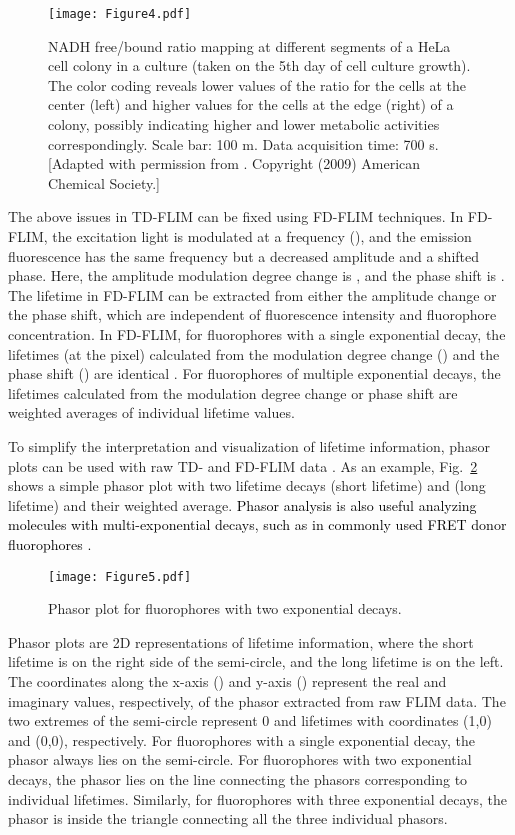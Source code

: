 \documentclass[12pt]{iopart}
\newcommand{\cc}[1]{\textcolor{black}{#1}}
\begin{document}
\begin{figure}[!t]
\centering
\texttt{[image: Figure4.pdf]}
\caption{NADH free/bound ratio mapping at different segments of a HeLa cell colony in a culture (taken on the 5th day of cell culture growth). The color coding reveals lower values of the  ratio for the cells at the center (left) and higher values for the cells at the edge (right) of a colony, possibly indicating higher and lower metabolic activities correspondingly. Scale bar: 100 m. Data acquisition time: 700 s. [Adapted with permission from \cite{nadh}. Copyright (2009) American Chemical Society.]}\label{fig1_nadh}
\end{figure}

The above issues in TD-FLIM can be fixed using FD-FLIM techniques. In FD-FLIM, the excitation light is modulated at a frequency (), and the emission fluorescence has the same frequency but a decreased amplitude and a shifted phase. Here, the amplitude modulation degree change is , and the phase shift is  \cite{howard2013frequency}. The lifetime in FD-FLIM can be extracted from either the amplitude change or the phase shift, which are independent of fluorescence intensity and fluorophore concentration. In FD-FLIM, for fluorophores with a single exponential decay, the lifetimes (at the  pixel) calculated from the modulation degree change () and the phase shift () are identical \cite{josa}. For fluorophores of multiple exponential decays, the lifetimes calculated from the modulation degree change or phase shift are weighted averages of individual lifetime values. 

To simplify the interpretation and visualization of lifetime information, phasor plots can be used with raw TD- and FD-FLIM data \cite{redford2005polar}. As an example, Fig.~\ref{td_fd_expla} shows a simple phasor plot with two lifetime decays  (short lifetime) and  (long lifetime) and their weighted average. \cc{Phasor analysis is also useful analyzing molecules with multi-exponential decays, such as in commonly used FRET donor fluorophores \cite{ranjit2018fit, fereidouni2014phasor_c1, lou2019phasor_c2, chen2015method_c3, caiolfa2007monomer_c4}.}

\begin{figure}[!t]
\centering
\texttt{[image: Figure5.pdf]}
\caption{Phasor plot for fluorophores with two exponential decays.}
\label{td_fd_expla}
\end{figure}

Phasor plots are 2D representations of lifetime information, where the short lifetime is on the right side of the semi-circle, and the long lifetime is on the left. The coordinates along the x-axis () and y-axis () represent the real and imaginary values, respectively, of the phasor extracted from raw FLIM data. The two extremes of the semi-circle represent 0 and  lifetimes with coordinates (1,0) and (0,0), respectively. For fluorophores with a single exponential decay, the phasor always lies on the semi-circle. For fluorophores with two exponential decays, the phasor lies on the line connecting the phasors corresponding to individual lifetimes. Similarly, for fluorophores with three exponential decays, the phasor is inside the triangle connecting all the three individual phasors.
\end{document}
